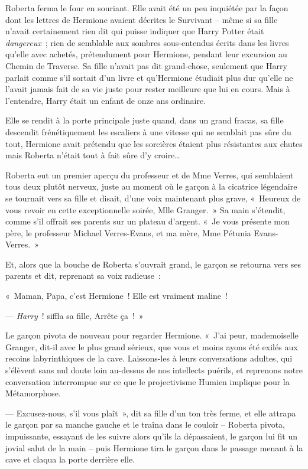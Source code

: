 Roberta ferma le four en souriant.
Elle avait été un peu inquiétée par la façon dont les lettres de Hermione avaient décrites le Survivant -- même si sa fille n'avait certainement rien dit qui puisse indiquer que Harry Potter était \emph{dangereux}~; rien de semblable aux sombres sous-entendus écrits dans les livres qu'elle avec achetés, prétendument pour Hermione, pendant leur excursion au Chemin de Traverse.
Sa fille n'avait pas dit grand-chose, seulement que Harry parlait comme s'il sortait d'un livre et qu'Hermione étudiait plus dur qu'elle ne l'avait jamais fait de sa vie juste pour rester meilleure que lui en cours.
Mais à l'entendre, Harry était un enfant de onze ans ordinaire.

Elle se rendit à la porte principale juste quand, dans un grand fracas, sa fille descendit frénétiquement les escaliers à une vitesse qui ne semblait pas sûre du tout, Hermione avait prétendu que les sorcières étaient plus résistantes aux chutes mais Roberta n'était tout à fait sûre d'y croire…

Roberta eut un premier aperçu du professeur et de Mme Verres, qui semblaient tous deux plutôt nerveux, juste au moment où le garçon à la cicatrice légendaire se tournait vers sa fille et disait, d'une voix maintenant plus grave, «~Heureux de vous revoir en cette exceptionnelle soirée, Mlle Granger.~»
Sa main s'étendit, comme s'il offrait ses parents sur un plateau d'argent.
«~Je vous présente mon père, le professeur Michael Verres-Evans, et ma mère, Mme Pétunia Evans-Verres.~»

Et, alors que la bouche de Roberta s'ouvrait grand, le garçon se retourna vers ses parents et dit, reprenant sa voix radieuse~:

«~Maman, Papa, c'est Hermione~!
Elle est vraiment maline~!

--- \emph{Harry}~! siffla sa fille, Arrête ça~!~»

Le garçon pivota de nouveau pour regarder Hermione.
«~J'ai peur, mademoiselle Granger, dit-il avec le plus grand sérieux, que vous et moins ayons été exilés aux recoins labyrinthiques de la cave.
Laissons-les à leurs conversations adultes, qui s'élèvent sans nul doute loin au-dessus de nos intellects puérils, et reprenons notre conversation interrompue sur ce que le projectivisme Humien implique pour la Métamorphose.

--- Excusez-nous, s'il vous plaît~», dit sa fille d'un ton très ferme, et elle attrapa le garçon par sa manche gauche et le traîna dans le couloir -- Roberta pivota, impuissante, essayant de les suivre alors qu'ils la dépassaient, le garçon lui fit un jovial salut de la main -- puis Hermione tira le garçon dans le passage menant à la cave et claqua la porte derrière elle.

